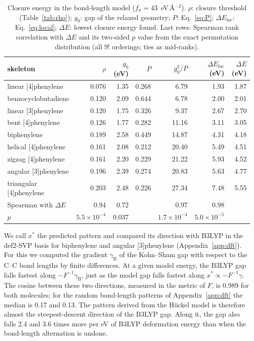 \documentclass[11pt]{article}
\begin{document}
\begin{table}[t]
\centering
\caption{Closure energy in the bond-length model ($f_\sigma=43$~eV\,\AA$^{-2}$). $\rho$: closure threshold (Table~\ref{tab:rho}); $g_0$: gap of the relaxed geometry; $P$: Eq.~\eqref{eq:P}; $\Delta E_{\text{loc}}$: Eq.~\eqref{eq:local}; $\Delta E$: lowest closure energy found. Last rows: Spearman rank correlation with $\Delta E$ and its two-sided $p$ value from the exact permutation distribution (all $9!$ orderings; ties as mid-ranks).}
\label{tab:cost}
\begin{tabular}{lrrrrrr}
\toprule
skeleton & $\rho$ & $g_0$ (eV) & $P$ & $g_0^2/P$ & $\Delta E_{\text{loc}}$ (eV) & $\Delta E$ (eV) \\
\midrule
linear [4]phenylene & 0.076 & 1.35 & 0.268 & 6.79 & 1.93 & 1.87 \\
benzocyclobutadiene & 0.120 & 2.09 & 0.644 & 6.78 & 2.00 & 2.01 \\
linear [3]phenylene & 0.120 & 1.75 & 0.326 & 9.37 & 2.67 & 2.70 \\
bent [4]phenylene & 0.126 & 1.77 & 0.282 & 11.16 & 3.11 & 3.05 \\
biphenylene & 0.189 & 2.58 & 0.449 & 14.87 & 4.31 & 4.18 \\
helical [4]phenylene & 0.161 & 2.08 & 0.212 & 20.40 & 5.49 & 4.51 \\
zigzag [4]phenylene & 0.161 & 2.20 & 0.229 & 21.22 & 5.93 & 4.52 \\
angular [3]phenylene & 0.196 & 2.39 & 0.274 & 20.83 & 5.63 & 4.77 \\
triangular [4]phenylene & 0.203 & 2.48 & 0.226 & 27.34 & 7.48 & 5.55 \\
\midrule
Spearman with $\Delta E$ & 0.94 & 0.72 & & 0.97 & 0.98 & \\
$p$ & $5.5\times10^{-4}$ & 0.037 & & $1.7\times10^{-4}$ & $5.0\times10^{-5}$ & \\
\bottomrule
\end{tabular}
\end{table}

We call $x^*$ the predicted pattern and compared its direction with B3LYP in the def2-SVP basis for biphenylene and angular [3]phenylene (Appendix~\ref{app:dft}). For this we computed the gradient $\gamma_{\mathrm B}$ of the Kohn--Sham gap with respect to the C--C bond lengths by finite differences. At a given model energy, the B3LYP gap falls fastest along $-F^{-1}\gamma_{\mathrm B}$, just as the model gap falls fastest along $x^*\propto-F^{-1}\gamma$. The cosine between these two directions, measured in the metric of $F$, is 0.989 for both molecules; for the random bond-length patterns of Appendix~\ref{app:dft} the median is 0.17 and 0.13. The pattern derived from the H\"uckel model is therefore almost the steepest-descent direction of the B3LYP gap. Along it, the gap also falls 2.4 and 3.6 times more per eV of B3LYP deformation energy than when the bond-length alternation is undone.
\end{document}
